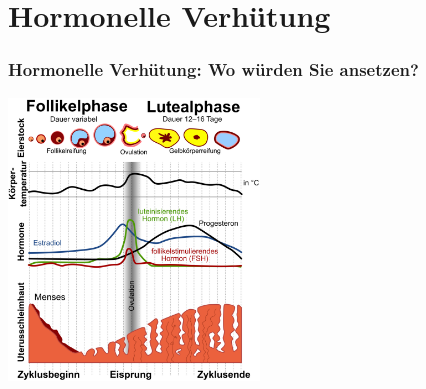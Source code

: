 \documentclass{beamer}
\begin{document}





\section{Hormonelle Verhütung}

\begin{frame}
\frametitle{Hormonelle Verhütung: Wo würden Sie ansetzen?}

\begin{center}
\includegraphics[width=0.5\textwidth]{zyklus.png}
\end{center}
\end{frame}
\end{document}
